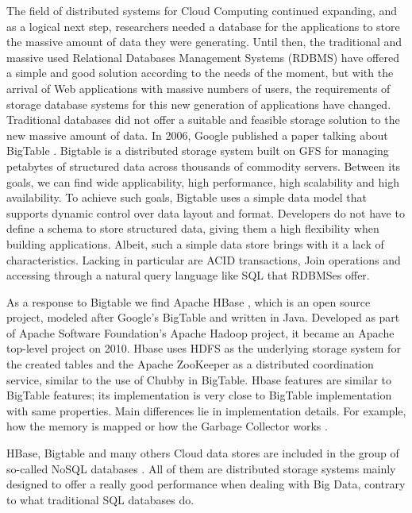 \par
The field of distributed systems for Cloud Computing continued expanding, and as a logical next step, researchers needed a database for the applications to store the massive amount of data they were generating. Until then, the traditional and massive used Relational Databases Management Systems (RDBMS) have offered a simple and good solution according to the needs of the moment, but with the arrival of Web applications with massive numbers of users, the requirements of storage database systems for this new generation of applications have changed. Traditional databases did not offer a suitable and feasible storage solution to the new massive amount of data. In 2006, Google published a paper talking about BigTable \cite{chang2008bigtable}. Bigtable is a distributed storage system built on GFS for managing petabytes of structured data across thousands of commodity servers. Between its goals, we can find wide applicability, high performance, high scalability and high availability. To achieve such goals, Bigtable uses a simple data model that supports dynamic control over data layout and format. Developers do not have to define a schema to store structured data, giving them a high flexibility when building applications. Albeit, such a simple data store brings with it a lack of characteristics. Lacking in particular are ACID transactions, Join operations and accessing through a natural query language like SQL that RDBMSes offer.
\par
As a response to Bigtable we find Apache HBase \cite{ApacheHBase}, which is an open source project, modeled after Google's BigTable and written in Java. Developed as part of Apache Software Foundation's Apache Hadoop project, it became an Apache top-level project on 2010. Hbase uses HDFS as the underlying storage system for the created tables and the Apache ZooKeeper as a distributed coordination service, similar to the use of Chubby \cite{burrows2006chubby} in BigTable. Hbase features are similar to BigTable features; its implementation is very close to BigTable implementation with same properties. Main differences lie in implementation details. For example, how the memory is mapped or how the Garbage Collector works \cite {samar2011scalable}.
\par
HBase, Bigtable and many others Cloud data stores are included in the group of so-called NoSQL databases \cite{NoSQLdatabases}. All of them are distributed storage systems mainly designed to offer a really good performance when dealing with Big Data, contrary to what traditional SQL databases do. 

\bigskip
{}
\bigskip


